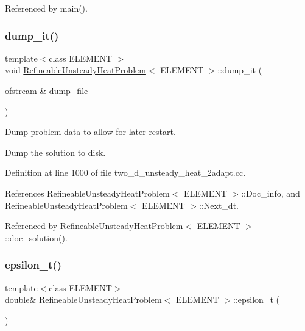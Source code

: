 Referenced by main().

\mbox{\label{classRefineableUnsteadyHeatProblem_a1fb939c3f9c258fd49328bb1516ced98}} 
\subsubsection{\texorpdfstring{dump\+\_\+it()}{dump\_it()}}
{\footnotesize\ttfamily template$<$class E\+L\+E\+M\+E\+NT $>$ \\
void \hyperlink{classRefineableUnsteadyHeatProblem}{Refineable\+Unsteady\+Heat\+Problem}$<$ E\+L\+E\+M\+E\+NT $>$\+::dump\+\_\+it (\begin{DoxyParamCaption}\item[{ofstream \&}]{dump\+\_\+file }\end{DoxyParamCaption})}



Dump problem data to allow for later restart. 

Dump the solution to disk. 

Definition at line 1000 of file two\+\_\+d\+\_\+unsteady\+\_\+heat\+\_\+2adapt.\+cc.



References Refineable\+Unsteady\+Heat\+Problem$<$ E\+L\+E\+M\+E\+N\+T $>$\+::\+Doc\+\_\+info, and Refineable\+Unsteady\+Heat\+Problem$<$ E\+L\+E\+M\+E\+N\+T $>$\+::\+Next\+\_\+dt.



Referenced by Refineable\+Unsteady\+Heat\+Problem$<$ E\+L\+E\+M\+E\+N\+T $>$\+::doc\+\_\+solution().

\mbox{\label{classRefineableUnsteadyHeatProblem_a7ae8870014736809c45ccf7ab6b0b684}} 
\subsubsection{\texorpdfstring{epsilon\+\_\+t()}{epsilon\_t()}}
{\footnotesize\ttfamily template$<$class E\+L\+E\+M\+E\+NT$>$ \\
double\& \hyperlink{classRefineableUnsteadyHeatProblem}{Refineable\+Unsteady\+Heat\+Problem}$<$ E\+L\+E\+M\+E\+NT $>$\+::epsilon\+\_\+t (\begin{DoxyParamCaption}{ }\end{DoxyParamCaption})\hspace{0.3cm}{\ttfamily [inline]}}



